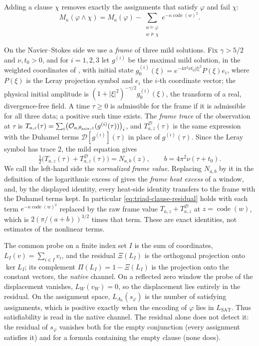 Adding a clause \(\chi\) removes exactly the assignments that satisfy
\(\varphi\) and fail \(\chi\):
\begin{equation}
\label{eq:triad-clause-residual}
 M_\kappa(\varphi\wedge\chi)
   =M_\kappa(\varphi)-
     \sum_{\substack{w\models\varphi\\w\not\models\chi}}
       e^{-\kappa\operatorname{code}(w)^2}.
\end{equation}

On the Navier--Stokes side we use a \emph{frame} of three mild
solutions.  Fix \(\gamma>5/2\) and \(\nu,t_{0}>0\), and for
\(i=1,2,3\) let \(g^{(i)}\) be the maximal mild solution, in the
weighted coordinates of , with initial state
\(g^{(i)}_{0}(\xi)=e^{-4\pi^{2}\nu t_{0}|\xi|^{2}}P(\xi)e_{i}\), where
\(P(\xi)\) is the Leray projection symbol and \(e_{i}\) the \(i\)-th
coordinate vector; the physical initial amplitude is
\((1+|\xi|^{2})^{-\gamma/2}g^{(i)}_{0}(\xi)\), the transform of a real,
divergence-free field.  A time \(\tau\ge0\) is admissible for the frame
if it is admissible for all three data; a positive such time exists.
The \emph{frame trace} of the observation at \(\tau\) is
\(T_{a,z}(\tau)=\sum_{i}\bigl(\mathcal O_{a,\theta_{\rm axis},z}(g^{(i)}(\tau))\bigr)_{i}\),
and \(T^{\mathcal D}_{a,z}(\tau)\) is the same expression with the
Duhamel terms \(\mathcal D[g^{(i)}](\tau)\) in place of \(g^{(i)}(\tau)\).
Since the Leray symbol has trace \(2\), the mild equation gives
\[
  \tfrac12\bigl(T_{a,z}(\tau)+T^{\mathcal D}_{a,z}(\tau)\bigr)=N_{a,b}(z),
  \qquad b=4\pi^{2}\nu(\tau+t_{0}).
\]
We call the left-hand side the \emph{normalized frame value}.  Replacing
\(N_{a,b}\) by it in the definition of the logarithmic excess of
 gives the \emph{frame heat excess} of a
window, and, by the displayed identity, every heat-side identity
transfers to the frame with the Duhamel terms kept.  In particular
\eqref{eq:triad-clause-residual} holds with each term
\(e^{-\kappa\operatorname{code}(w)^{2}}\) replaced by the raw frame value
\(T_{a,z}+T^{\mathcal D}_{a,z}\) at \(z=\operatorname{code}(w)\), which is
\(2(\pi/(a+b))^{3/2}\) times that term.  These are exact identities,
not estimates of the nonlinear terms.

The common probe on a finite index set \(I\) is the sum of coordinates,
\(L_{I}(v)=\sum_{i\in I}v_{i}\), and the residual \(\Xi(L_{I})\) is the
orthogonal projection onto \(\ker L_{I}\); its complement
\(\Pi(L_{I})=1-\Xi(L_{I})\) is the projection onto the constant vectors,
the \emph{native} channel.  On a reflected zero window the probe of the
displacement vanishes, \(L_{W}(v_{W})=0\), so the displacement lies
entirely in the residual.  On the assignment space,
\(L_{A_{n}}(s_{\varphi})\) is the number of satisfying assignments,
which is positive exactly when the encoding of \(\varphi\) lies in
\(L_{\mathrm{SAT}}\).  Thus satisfiability is read in the native
channel.  The residual alone does not detect it: the residual of
\(s_{\varphi}\) vanishes both for the empty conjunction (every
assignment satisfies it) and for a formula containing the empty clause
(none does).

